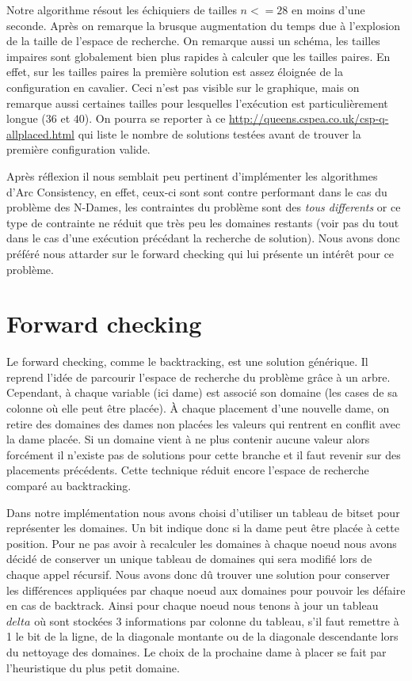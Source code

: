 \documentclass[10pt,a4paper]{report}
\begin{document}
Notre algorithme résout les échiquiers de tailles $n <= 28$ en moins d'une seconde. Après on remarque la brusque augmentation du temps due à l'explosion de la taille de l'espace de recherche.
On remarque aussi un schéma, les tailles impaires sont globalement bien plus rapides à calculer que les tailles paires. En effet, sur les tailles paires la première solution est assez éloignée de la configuration en cavalier.
Ceci n'est pas visible sur le graphique, mais on remarque aussi certaines tailles pour lesquelles l’exécution est particulièrement longue ($36$ et $40$).
On pourra se reporter à ce \url{http://queens.cspea.co.uk/csp-q-allplaced.html} qui liste le nombre de solutions testées avant de trouver la première configuration valide.

Après réflexion il nous semblait peu pertinent d'implémenter les algorithmes d'Arc Consistency, en effet, ceux-ci sont sont contre performant dans le cas du problème des N-Dames, les contraintes du problème sont des
\textit{tous differents} or ce type de contrainte ne réduit que très peu les domaines restants (voir pas du tout dans le cas d'une exécution précédant la recherche de solution).
Nous avons donc préféré nous attarder sur le forward checking qui lui présente un intérêt pour ce problème.

\break
\section{Forward checking}

Le forward checking, comme le backtracking, est une solution générique. Il reprend l'idée de parcourir l'espace de recherche du problème grâce à un arbre.
Cependant, à chaque variable (ici dame) est associé son domaine (les cases de sa colonne où elle peut être placée).
À chaque placement d'une nouvelle dame, on retire des domaines des dames non placées les valeurs qui rentrent en conflit avec la dame placée.
Si un domaine vient à ne plus contenir aucune valeur alors forcément il n'existe pas de solutions pour cette branche et il faut revenir sur des placements précédents.
Cette technique réduit encore l'espace de recherche comparé au backtracking.

Dans notre implémentation nous avons choisi d'utiliser un tableau de bitset pour représenter les domaines.
Un bit indique donc si la dame peut être placée à cette position.
Pour ne pas avoir à recalculer les domaines à chaque noeud nous avons décidé de conserver un unique tableau de domaines qui sera modifié lors de chaque appel récursif.
Nous avons donc dû trouver une solution pour conserver les différences appliquées par chaque noeud aux domaines pour pouvoir les défaire en cas de backtrack.
Ainsi pour chaque noeud nous tenons à jour un tableau $delta$ où sont stockées 3 informations par colonne du tableau,
s'il faut remettre à 1 le bit de la ligne, de la diagonale montante ou de la diagonale descendante lors du nettoyage des domaines.
Le choix de la prochaine dame à placer se fait par l'heuristique du plus petit domaine.
\end{document}
